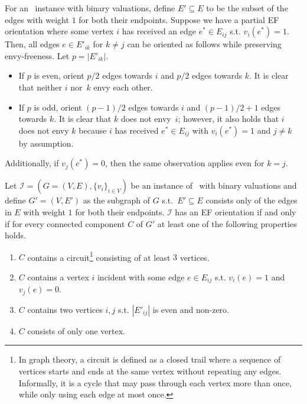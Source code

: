 \begin{observation}\label{obs:happy_vertex}
    For an \EFo\ instance with binary valuations, define $E'\subseteq E$ to be the subset of the edges with weight $1$ for both their endpoints. Suppose we have a partial EF orientation where some vertex $i$ has received an edge $e^*\in E_{ij}$ s.t. $v_i(e^*)=1$. Then, all edges $e\in E'_{ik}$ for $k\neq j$ can be oriented as follows while preserving envy-freeness. Let $p=|E'_{ik}|$.
    \begin{itemize}
        \item If $p$ is even, orient $p/2$ edges towards $i$ and $p/2$ edges towards $k$. It is clear that neither $i$ nor~$k$ envy each other.
        \item If $p$ is odd, orient $(p-1)/2$ edges towards $i$ and $(p-1)/2 +1$ edges towards $k$. It is clear that $k$ does not envy~$i$; however, it also holds that $i$ does not envy $k$ because $i$ has received $e^*\in E_{ij}$ with $v_i(e^*)=1$ and $j\neq k$ by assumption.
    \end{itemize}
    Additionally, if $v_j(e^*)=0$, then the same observation applies even for $k = j$.
\end{observation}



\begin{theoremrep}\label{theorem:connected_component_props}
    Let $\mathcal{I}=(G=(V,E),\{v_i\}_{i\in V})$ be an instance of \EFo\ with binary valuations and define $G'=(V,E')$ as the subgraph of $G$ s.t.~$E'\subseteq E$ consists only of the edges in $E$ with weight $1$ for both their endpoints. $\mathcal{I}$ has an EF orientation if and only if for every connected component $C$ of $G'$ at least one of the following properties holds.
    \begin{enumerate}
        \item $C$ contains a circuit\footnote{In graph theory, a circuit is defined as a closed trail where a sequence of vertices starts and ends at the same vertex without repeating any edges. Informally, it is a cycle that may pass through each vertex more than once, while only using each edge at most once.} consisting of at least $3$ vertices.\label{prop1}
        \item $C$ contains a vertex $i$ incident with some edge $e\in E_{ij}$ s.t. $v_i(e)=1$ and $v_j(e)=0$.\label{prop2}
        \item $C$ contains two vertices $i,j$ s.t. $|E'_{ij}|$ is even and non-zero.\label{prop3}
        \item $C$ consists of only one vertex.\label{prop4}
    \end{enumerate}
\end{theoremrep}



